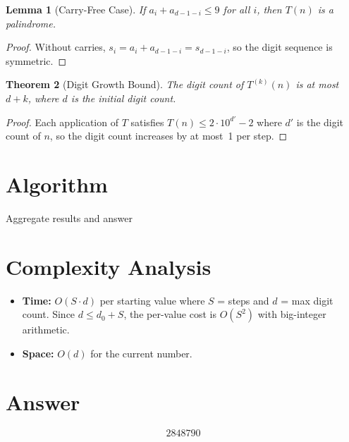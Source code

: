 \documentclass[11pt]{article}
\newtheorem{theorem}{Theorem}
\newtheorem{lemma}[theorem]{Lemma}
\begin{document}
\begin{lemma}[Carry-Free Case]
If $a_i + a_{d-1-i} \le 9$ for all $i$, then $T(n)$ is a palindrome.
\end{lemma}

\begin{proof}
Without carries, $s_i = a_i + a_{d-1-i} = s_{d-1-i}$, so the digit sequence is symmetric.
\end{proof}

\begin{theorem}[Digit Growth Bound]
The digit count of $T^{(k)}(n)$ is at most $d + k$, where $d$ is the initial digit count.
\end{theorem}

\begin{proof}
Each application of $T$ satisfies $T(n) \le 2 \cdot 10^{d'} - 2$ where $d'$ is the digit count of $n$, so the digit count increases by at most~1 per step.
\end{proof}

\section{Algorithm}

\begin{algorithm}[H]
\SetAlgoLined
{}
Aggregate results and \Return answer\;
\end{algorithm}

\section{Complexity Analysis}

\begin{itemize}
\item \textbf{Time:} $O(S \cdot d)$ per starting value where $S$ = steps and $d$ = max digit count. Since $d \le d_0 + S$, the per-value cost is $O(S^2)$ with big-integer arithmetic.
\item \textbf{Space:} $O(d)$ for the current number.
\end{itemize}

\section{Answer}

\[
\boxed{2848790}
\]
\end{document}
